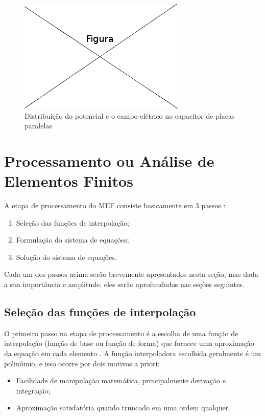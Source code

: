 \documentclass[
    12pt,               %
    openright,          %
    oneside,
    a4paper,            %
    english,            %
    french,             %
    spanish,            %
    brazil              %
    ]{abntex2}
\begin{document}
\begin{figure}[!htb]
\centering
\includegraphics[scale=0.5]{figuras/temp.png}
\caption{Distribuição do potencial e o campo elétrico no capacitor de placas paralelas}
\label{fig:capacitor}
\end{figure}


\section{Processamento ou Análise de Elementos Finitos}
\label{sec:proc}

A etapa de processamento do MEF consiste basicamente em 3 passos \cite[p. 31]{jin}:

\begin{enumerate}  
\item Seleção das funções de interpolação;
\item Formulação do sistema de equações;
\item Solução do sistema de equações. 
\end{enumerate}

Cada um dos passos acima serão brevemente apresentados nesta seção, mas dada a sua importância e amplitude, eles serão aprofundados nas seções seguintes.

\subsection{Seleção das funções de interpolação}
O primeiro passo na etapa de processamento é a escolha de uma função de interpolação (função de base ou função de forma) \cite[p. 37]{volakis} que fornece uma aproximação da equação em cada elemento \cite[p. 32]{jin}. 
A função interpoladora escolhida geralmente é um polinômio, e isso ocorre por dois motivos a priori: \cite[p. 77]{desai}

\begin{itemize}  
\item Facilidade de manipulação matemática, principalmente derivação e integração;
\item Aproximação satisfatória quando truncado em uma ordem qualquer.
\end{itemize}
\end{document}
